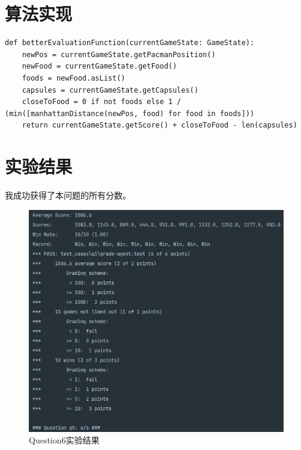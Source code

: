 \section{算法实现}
%
%
\begin{lstlisting}[emph={[3]currentGameState,gameState,depth,alpha,beta,ghostNo,ghostNum},emphstyle={[3]\color{vscode_parametercolor}},emph={[4]GameState,MinimaxAgent,AlphaBetaAgent},emphstyle={[4]\color{vscode_classcolor}}]
def betterEvaluationFunction(currentGameState: GameState):
    newPos = currentGameState.getPacmanPosition()
    newFood = currentGameState.getFood()
    foods = newFood.asList()
    capsules = currentGameState.getCapsules()
    closeToFood = 0 if not foods else 1 / (min([manhattanDistance(newPos, food) for food in foods]))
    return currentGameState.getScore() + closeToFood - len(capsules)
\end{lstlisting}
\section{实验结果}
%
%
我成功获得了本问题的所有分数。
\begin{figure}[htbp]
    \centering
    \includegraphics[scale = 0.7]{pic/q6.png}
    \caption{Question6实验结果}\label{q6}
\end{figure}

